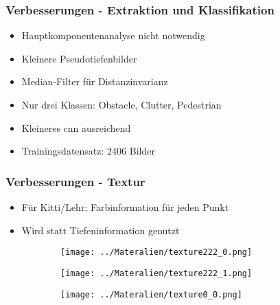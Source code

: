 \begin{frame}
    \frametitle{Verbesserungen - Extraktion und Klassifikation}
    \begin{itemize}
        \item Hauptkomponentenanalyse nicht notwendig
            \pause
        \item Kleinere Pseudotiefenbilder
            \pause
        \item Median-Filter für Distanzinvarianz
            \pause
        \item Nur drei Klassen: Obstacle, Clutter, Pedestrian
            \pause
        \item Kleineres \ac{cnn} ausreichend
            \pause
        \item Trainingsdatensatz: 2406 Bilder
    \end{itemize}
\end{frame}

\begin{frame}
    \frametitle{Verbesserungen - Textur}
    \begin{itemize}
        \item Für Kitti/Lehr: Farbinformation für jeden Punkt
            \pause
        \item Wird statt Tiefeninformation genutzt
            \pause
    \end{itemize}
    \begin{figure}[h!]
        \centering
        \begin{subfigure}[c]{0.3\textwidth}
            \texttt{[image: ../Materalien/texture222\_0.png]}
        \end{subfigure}
        \begin{subfigure}[c]{0.3\textwidth}
            \texttt{[image: ../Materalien/texture222\_1.png]}
        \end{subfigure}
        \begin{subfigure}[c]{0.3\textwidth}
            \texttt{[image: ../Materalien/texture0\_0.png]}
        \end{subfigure}
    \end{figure}
\end{frame}


